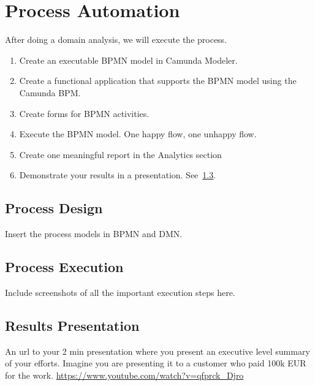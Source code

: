 \chapter{Process Automation}

After doing a domain analysis, we will execute the process. 

\begin{enumerate}
    \item Create an executable BPMN model in Camunda Modeler. 
    \item Create a functional application that supports the BPMN model using the Camunda BPM.
    \item Create forms for BPMN activities. 
    \item Execute the BPMN model. One happy flow, one unhappy flow. 
    \item Create one meaningful report in the Analytics section
    \item Demonstrate your results in a presentation. See~\cref{sec:presentation}. 
\end{enumerate}



\section{Process Design}

Insert the process models in BPMN and DMN. 

\section{Process Execution}

Include screenshots of all the important execution steps here. 


\section{Results Presentation}\label{sec:presentation}

An url to your 2 min presentation where you present an executive level summary of your efforts. Imagine you are presenting it to a customer who paid 100k EUR for the work. \url{https://www.youtube.com/watch?v=qfprck_Djro} 